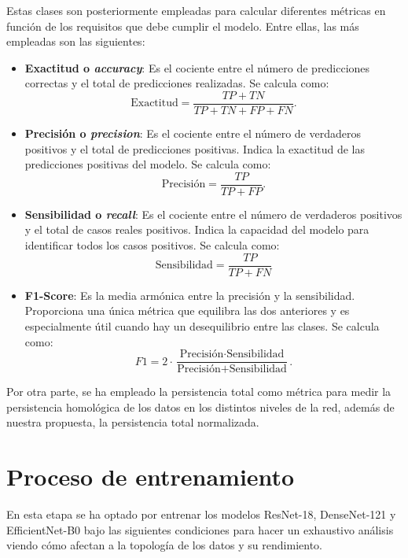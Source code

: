 Estas clases son posteriormente empleadas para calcular diferentes métricas en función de los requisitos que debe cumplir el modelo. Entre ellas, las más empleadas son las siguientes:

\begin{itemize}
	\item \textbf{Exactitud o \textit{accuracy}}: Es el cociente entre el número de predicciones correctas y el total de predicciones realizadas. Se calcula como:
	\[
	\text{Exactitud} = \frac{TP + TN}{TP + TN + FP + FN}.
	\]
	\item \textbf{Precisión o \textit{precision}}: Es el cociente entre el número de verdaderos positivos y el total de predicciones positivas. Indica la exactitud de las predicciones positivas del modelo. Se calcula como:
	\[
	\text{Precisión} = \frac{TP}{TP + FP}.
	\]
	\item \textbf{Sensibilidad o \textit{recall}}: Es el cociente entre el número de verdaderos positivos y el total de casos reales positivos. Indica la capacidad del modelo para identificar todos los casos positivos. Se calcula como:
	\[
	\text{Sensibilidad} = \frac{TP}{TP + FN}
	\]
	\item \textbf{F1-Score}: Es la media armónica entre la precisión y la sensibilidad. Proporciona una única métrica que equilibra las dos anteriores y es especialmente útil cuando hay un desequilibrio entre las clases. Se calcula como:
	\[
	F1 = 2 \cdot \frac{\text{Precisión} \cdot \text{Sensibilidad}}{\text{Precisión} + \text{Sensibilidad}}.
	\]
\end{itemize}

Por otra parte, se ha empleado la persistencia total como métrica para medir la persistencia homológica de los datos en los distintos niveles de la red, además de nuestra propuesta, la persistencia total normalizada.

\section{Proceso de entrenamiento} \label{sec:train}

En esta etapa se ha optado por entrenar los modelos ResNet-18, DenseNet-121 y EfficientNet-B0 bajo las siguientes condiciones para hacer un exhaustivo análisis viendo cómo afectan a la topología de los datos y su rendimiento.

